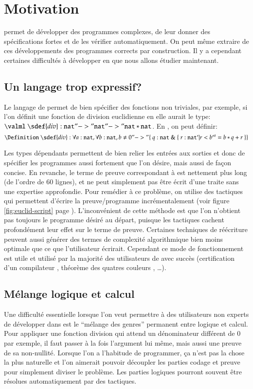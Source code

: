\section{Motivation}

\Coq{} permet de d\'evelopper des programmes complexes,
de leur donner des sp\'ecifications fortes et de les v\'erifier
automatiquement. On peut m\^eme extraire de ces d\'eveloppements des
programmes corrects par construction. Il y a cependant certaines
difficult\'es \`a d\'evelopper en \Coq{} que nous allons \'etudier maintenant.

\subsection{Un langage trop expressif?} 

Le langage de \CCI{} permet de bien sp\'ecifier des fonctions non
triviales, par exemple, si l'on d\'efinit une fonction de division
euclidienne en \ML{} elle aurait le type: $  \valml~\sdef{div} : \nat "->" \nat "->"
\nat * \nat$. En \Coq, on peut d\'efinir:
\[\Definition~\sdef{div} : \forall a : \nat, \forall b : \nat,
b \neq 0 "->" \{~q : \nat~\&~\{~r : \nat `| r < b `^ a = b * q + r~\} \}\]

Les types d\'ependants permettent de bien relier les entr\'ees aux sorties
et donc de sp\'ecifier les programmes aussi fortement que l'on d\'esire, 
mais aussi de fa\c con concise. En revanche, le terme de preuve 
correspondant \`a  est nettement plus long (de l'ordre de 60 lignes), 
et ne peut simplement pas \^etre \'ecrit d'une traite 
sans une expertise approfondie. Pour rem\'edier \`a ce
probl\`eme, on utilise des tactiques qui permettent d'\'ecrire la preuve/programme
incr\'ementalement (voir figure \ref{fig:euclid-script}
page \pageref{fig:euclid-script}). L'inconv\'enient de cette
m\'ethode est que l'on n'obtient pas toujours le programme d\'esir\'e
au d\'epart, puisque les tactiques cachent profond\'ement leur effet sur le
terme de preuve. Certaines techniques de r\'e\'ecriture peuvent aussi
g\'en\'erer des termes de complexit\'e algorithmique bien moins optimale que
ce que l'utilisateur \'ecrirait. Cependant ce mode de fonctionnement est
utile et utilis\'e par la majorit\'e des utilisateurs de \Coq{} avec succ\`es
(certification d'un compilateur \C, th\'eor\`eme des quatres couleurs
\cite{Gonthier4col}, \ldots).

\subsection{M\'elange logique et calcul}
Une difficult\'e essentielle lorsque l'on veut permettre \`a des
utilisateurs non experts de d\'evelopper dans \Coq{} est le ``m\'elange
des genres'' permanent entre logique et calcul. Pour appliquer une
fonction division qui attend un d\'enominateur diff\'erent de $0$ par
exemple, il faut passer \`a la fois l'argument lui m\^eme, mais aussi une
preuve de sa non-nullit\'e. Lorsque l'on a l'habitude de programmer, \c ca
n'est pas la chose la plus naturelle et l'on aimerait pouvoir d\'ecoupler
les parties codage et preuve pour simplement diviser le probl\`eme. Les
parties logiques pourront souvent \^etre r\'esolues automatiquement par des
tactiques.

